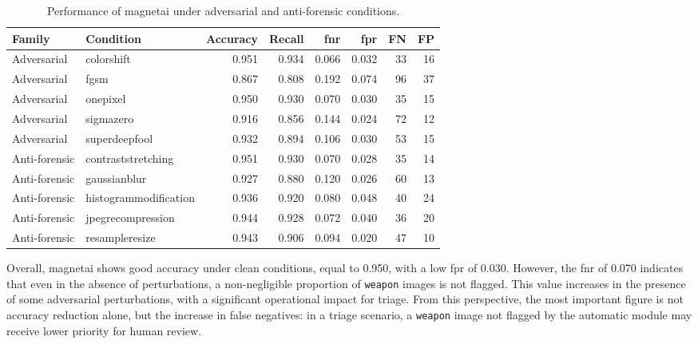 \begin{table}[H]
\centering
\caption{Performance of \gls{magnetai} under adversarial and anti-forensic conditions.}
\label{tab:results-magnet-attack-metrics}
\scriptsize
\renewcommand{\arraystretch}{1.12}
\setlength{\tabcolsep}{4pt}
\begin{tabular}{@{}l l r r r r r r@{}}
\toprule
\textbf{Family} &
\textbf{Condition} &
\textbf{Accuracy} &
\textbf{Recall} &
\textbf{\gls{fnr}} &
\textbf{\gls{fpr}} &
\textbf{FN} &
\textbf{FP} \\
\midrule

Adversarial &
\gls{colorshift} &
0.951 &
0.934 &
0.066 &
0.032 &
33 &
16 \\

Adversarial &
\gls{fgsm} &
0.867 &
0.808 &
0.192 &
0.074 &
96 &
37 \\

Adversarial &
\gls{onepixel} &
0.950 &
0.930 &
0.070 &
0.030 &
35 &
15 \\

Adversarial &
\gls{sigmazero} &
0.916 &
0.856 &
0.144 &
0.024 &
72 &
12 \\

Adversarial &
\gls{superdeepfool} &
0.932 &
0.894 &
0.106 &
0.030 &
53 &
15 \\

\midrule

Anti-forensic &
\gls{contraststretching} &
0.951 &
0.930 &
0.070 &
0.028 &
35 &
14 \\

Anti-forensic &
\gls{gaussianblur} &
0.927 &
0.880 &
0.120 &
0.026 &
60 &
13 \\

Anti-forensic &
\gls{histogrammodification} &
0.936 &
0.920 &
0.080 &
0.048 &
40 &
24 \\

Anti-forensic &
\gls{jpegrecompression} &
0.944 &
0.928 &
0.072 &
0.040 &
36 &
20 \\

Anti-forensic &
\gls{resampleresize} &
0.943 &
0.906 &
0.094 &
0.020 &
47 &
10 \\

\bottomrule
\end{tabular}
\end{table}

Overall, \gls{magnetai} shows good accuracy under clean conditions, equal to
0.950, with a low \gls{fpr} of 0.030. However, the \gls{fnr} of 0.070 indicates
that even in the absence of perturbations, a non-negligible proportion of
\texttt{weapon} images is not flagged. This value increases in the presence of
some adversarial perturbations, with a significant operational impact for
triage. From this perspective, the most important figure is not accuracy
reduction alone, but the increase in false negatives: in a triage scenario, a
\texttt{weapon} image not flagged by the automatic module may receive lower
priority for human review.

